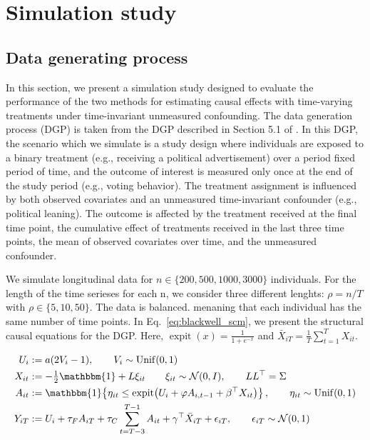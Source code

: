 \chapter{Simulation study}
\label{chap:simulation_study} 
\section{Data generating process}
In this section, we present a simulation study designed to evaluate the performance 
of the two methods for estimating causal effects with time-varying treatments 
under time-invariant unmeasured confounding. The data generation process (DGP) is taken 
from the DGP described in Section 5.1 of \cite{blackwellEffectPoliticalAdvertising2024}. In this 
DGP, the scenario which we simulate is a study design where individuals are exposed to a binary treatment
(e.g., receiving a political advertisement) over a period fixed period of time, and the outcome of interest
is measured only once at the end of the study period (e.g., voting behavior). The treatment assignment
is influenced by both observed covariates and an unmeasured time-invariant confounder (e.g., political
leaning). The outcome is affected by the treatment received at the final time point, the cumulative 
effect of treatments received in the last three time points, the mean of observed covariates over time, 
and the unmeasured confounder. 

We simulate longitudinal data for $n \in \{200, 500, 1000, 3000\}$ individuals. For the
length of the time serieses for each n, we consider three different lenghts: $\rho = n/T$ 
with $\rho \in \{5,10,50\}$. The data is balanced. menaning that each individual has 
the same number of time points. In Eq.~\eqref{eq:blackwell_scm}, we present 
the structural causal equations for the DGP. Here, $\operatorname{expit}(x) = \frac{1}{1 + e^{-x}}$ and 
$\bar{X}_{iT} = \frac{1}{T}\sum_{t=1}^T X_{it}$.

\begin{subequations}\label{eq:blackwell_scm}
\begin{align}
U_i &:= a(2V_i-1), \qquad V_i \sim \operatorname{Unif}(0,1)
\\
X_{it} &:= -\tfrac12\mathbbm{1} + L \xi_{it} \qquad \xi_{it}\sim \mathcal{N}(0,I), \qquad LL^\top=\Sigma
\\
A_{it} &:= \mathbbm{1}\!\left\{\eta_{it} \le
\operatorname{expit}\!\left(U_i+\varphi A_{i,t-1}+\beta^\top X_{it}\right)\right\},
\qquad \eta_{it} \sim \operatorname{Unif}(0,1)
\\
Y_{iT} &:= U_i + \tau_F A_{iT} + \tau_C \sum_{t=T-3}^{T-1} A_{it}
+ \gamma^\top \bar X_{iT} + \epsilon_{iT},
\qquad \epsilon_{iT} \sim \mathcal{N}(0,1)
\label{eq:blackwell_scm_outcome}
\end{align}
\end{subequations}

